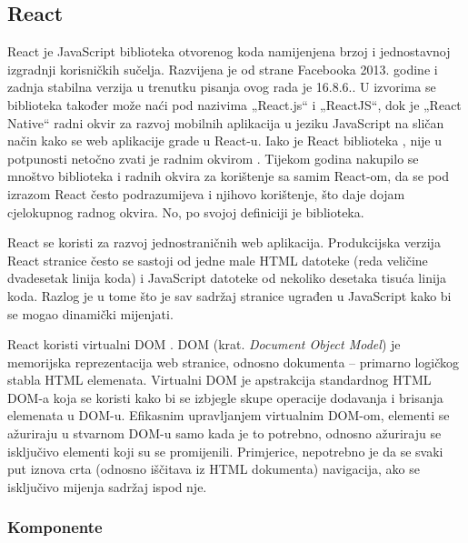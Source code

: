 \documentclass[times, utf8, diplomski, numeric]{fer}
\newcommand{\razmakp}{\vspace{18pt}}
\newcommand{\razmaks}{\vspace{10pt}}
\begin{document}
\razmaks
\subsection{React} \label{sec:react}

React je JavaScript biblioteka otvorenog koda namijenjena brzoj i jednostavnoj izgradnji korisničkih sučelja.
Razvijena je od strane Facebooka 2013. godine i zadnja stabilna verzija u trenutku pisanja ovog rada je 16.8.6.\citep{gh_react_changelog}.
U izvorima se biblioteka također može naći pod nazivima „React.js“ i „ReactJS“, dok je „React Native“ radni okvir za razvoj mobilnih aplikacija u jeziku JavaScript na sličan način kako se web aplikacije grade u React-u\citep{wiki_react}.
Iako je React biblioteka , nije u potpunosti netočno zvati je radnim okvirom .
Tijekom godina nakupilo se mnoštvo biblioteka i radnih okvira za korištenje sa samim React-om, da se pod izrazom React često podrazumijeva i njihovo korištenje, što daje dojam cjelokupnog radnog okvira. No, po svojoj definiciji je biblioteka.

React se koristi za razvoj jednostraničnih  web aplikacija.
Produkcijska verzija React stranice često se sastoji od jedne male HTML datoteke (reda veličine dvadesetak linija koda) i JavaScript datoteke od nekoliko desetaka tisuća linija koda.
Razlog je u tome što je sav sadržaj stranice ugrađen u JavaScript kako bi se mogao dinamički mijenjati.

\razmakp

React koristi virtualni DOM .
DOM (krat. \emph{Document Object Model}) je memorijska reprezentacija web stranice, odnosno dokumenta – primarno logičkog stabla HTML elemenata\citep{mdn_dom}.
Virtualni DOM je apstrakcija standardnog HTML DOM-a koja se koristi kako bi se izbjegle skupe operacije dodavanja i brisanja elemenata u DOM-u.
Efikasnim upravljanjem virtualnim DOM-om, elementi se ažuriraju u stvarnom DOM-u samo kada je to potrebno, odnosno ažuriraju se isključivo elementi koji su se promijenili\citep{med_vdom}.
Primjerice, nepotrebno je da se svaki put iznova crta (odnosno iščitava iz HTML dokumenta) navigacija, ako se isključivo mijenja sadržaj ispod nje.

\razmakp
\subsubsection{Komponente}
\end{document}
